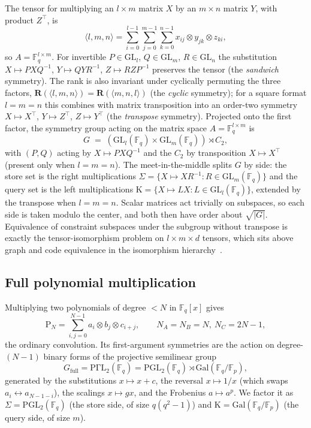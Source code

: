 \documentclass[11pt]{article}
\theoremstyle{definition}
\newcommand{\F}{\mathbb{F}}
\newcommand{\R}{\mathbf{R}}
\newcommand{\Fullt}[1]{\mathrm{P}_{#1}}
\newcommand{\GL}{\mathrm{GL}}
\newcommand{\PGL}{\mathrm{PGL}}
\newcommand{\Gal}{\mathrm{Gal}}
\newcommand{\Kappa}{\mathrm{K}}
\newcommand{\mmt}[3]{\langle #1,#2,#3\rangle}
\begin{document}
The tensor for multiplying an $l\times m$ matrix $X$ by an $m\times n$ matrix $Y$, with product $Z^{\!\top}$, is
\[
  \mmt{l}{m}{n} = \sum_{i=0}^{l-1}\sum_{j=0}^{m-1}\sum_{k=0}^{n-1}
  x_{ij}\otimes y_{jk}\otimes z_{ki},
\]
so $A=\F_q^{l\times m}$. For invertible $P\in\GL_l$, $Q\in\GL_m$, $R\in\GL_n$ the
substitution $X\mapsto PXQ^{-1}$, $Y\mapsto QYR^{-1}$, $Z\mapsto RZP^{-1}$ preserves
the tensor (the \emph{sandwich} symmetry). The rank is also invariant under
cyclically permuting the three factors, $\R(\mmt{l}{m}{n})=\R(\mmt{m}{n}{l})$ (the
\emph{cyclic} symmetry); for a square format $l=m=n$ this combines with matrix
transposition into an order-two symmetry
$X\mapsto X^{\!\top}$, $Y\mapsto Z^{\!\top}$, $Z\mapsto Y^{\!\top}$ (the \emph{transpose} symmetry). Projected onto the
first factor, the symmetry group acting on the matrix space $A=\F_q^{l\times m}$ is
\[
  G \;=\; (\GL_l(\F_q)\times \GL_m(\F_q)) \rtimes C_2,
\]
with $(P,Q)$ acting by $X\mapsto PXQ^{-1}$ and the $C_2$ by transposition $X\mapsto X^{\!\top}$ (present
only when $l=m=n$). The meet-in-the-middle splits $G$ by side:
the store set is the right multiplications $\Sigma=\{X\mapsto XR^{-1}:R\in\GL_m(\F_q)\}$ and
the query set is the left multiplications $\Kappa=\{X\mapsto LX:L\in\GL_l(\F_q)\}$,
extended by the transpose when $l=m=n$. Scalar matrices act trivially on subspaces,
so each side is taken modulo the center, and both then have order about $\sqrt{|G|}$.
Equivalence of constraint subspaces under the subgroup without transpose is exactly
the tensor-isomorphism problem on $l\times m\times d$ tensors, which sits above graph
and code equivalence in the isomorphism hierarchy~\cite{grochow2023complexity,grochow2025complexity}.

\subsection{Full polynomial multiplication}

Multiplying two polynomials of degree $<N$ in $\F_q[x]$ gives
\[
  \Fullt{N} = \sum_{i,j=0}^{N-1} a_i\otimes b_j\otimes c_{i+j},
  \qquad N_A=N_B=N,\ N_C=2N-1,
\]
the ordinary convolution. Its first-argument symmetries are the action on
degree-$(N-1)$ binary forms of the projective semilinear group
\[
  G_{\mathrm{full}} = \mathrm{P\Gamma L}_2(\F_q)
  = \PGL_2(\F_q)\rtimes \Gal(\F_q/\F_p),
\]
generated by the substitutions $x\mapsto x+c$, the reversal $x\mapsto 1/x$ (which
swaps $a_i\leftrightarrow a_{N-1-i}$), the scalings $x\mapsto gx$, and the
Frobenius $a\mapsto a^p$. We factor it as
$\Sigma=\PGL_2(\F_q)$ (the store side, of size $q(q^2-1)$) and
$\Kappa=\Gal(\F_q/\F_p)$ (the query side, of size $m$).
\end{document}
